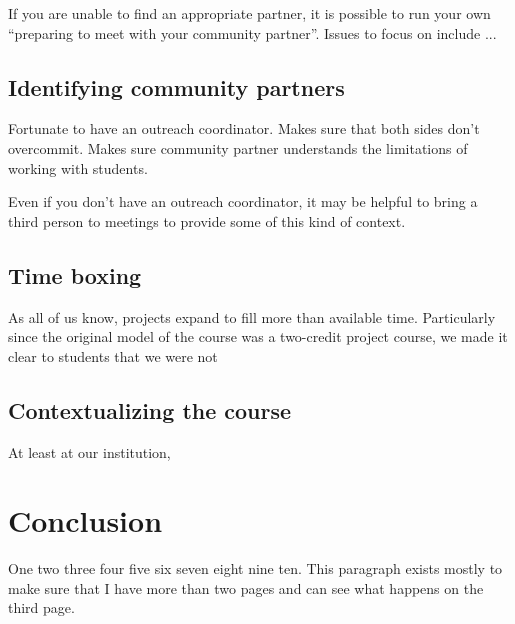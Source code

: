 If you are unable to find an appropriate partner, it is possible to run
your own ``preparing to meet with your community partner''.  Issues to
focus on include ...


\subsection{Identifying community partners}

Fortunate to have an outreach coordinator.  Makes sure that both sides
don't overcommit.  Makes sure community partner understands the limitations
of working with students.

Even if you don't have an outreach coordinator, it may be helpful to
bring a third person to meetings to provide some of this kind of context.

\subsection{Time boxing}

As all of us know, projects expand to fill more than available time.
Particularly since the original model of the course was a two-credit
project course, we made it clear to students that we were not 

\subsection{Contextualizing the course}

At least at our institution, 

\section{Conclusion}

One two three four five six seven eight nine ten.  This paragraph exists
mostly to make sure that I have more than two pages and can see what
happens on the third page.
